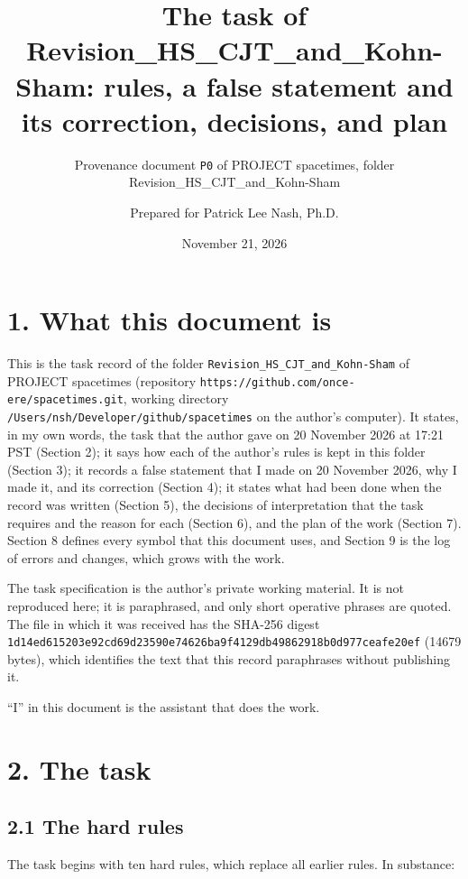 \documentclass[
  10pt,
]{article}
\title{The task of Revision\_HS\_CJT\_and\_Kohn-Sham: rules, a false
statement and its correction, decisions, and plan}
\subtitle{Provenance document \texttt{P0} of PROJECT spacetimes, folder
Revision\_HS\_CJT\_and\_Kohn-Sham}
\author{Prepared for Patrick Lee Nash, Ph.D.}
\date{November 21, 2026}
\begin{document}
\maketitle

\hypertarget{what-this-document-is}{%
\section{1. What this document is}\label{what-this-document-is}}

This is the task record of the folder
\texttt{Revision\_HS\_CJT\_and\_Kohn-Sham} of PROJECT spacetimes
(repository \texttt{https://github.com/once-ere/spacetimes.git}, working
directory \texttt{/Users/nsh/Developer/github/spacetimes} on the
author's computer). It states, in my own words, the task that the author
gave on 20 November 2026 at 17:21 PST (Section 2); it says how each of
the author's rules is kept in this folder (Section 3); it records a
false statement that I made on 20 November 2026, why I made it, and its
correction (Section 4); it states what had been done when the record was
written (Section 5), the decisions of interpretation that the task
requires and the reason for each (Section 6), and the plan of the work
(Section 7). Section 8 defines every symbol that this document uses, and
Section 9 is the log of errors and changes, which grows with the work.

The task specification is the author's private working material. It is
not reproduced here; it is paraphrased, and only short operative phrases
are quoted. The file in which it was received has the SHA-256 digest
\texttt{1d14ed615203e92cd69d23590e74626ba9f4129db49862918b0d977ceafe20ef}
(14679 bytes), which identifies the text that this record paraphrases
without publishing it.

``I'' in this document is the assistant that does the work.

\hypertarget{the-task}{%
\section{2. The task}\label{the-task}}

\hypertarget{the-hard-rules}{%
\subsection{2.1 The hard rules}\label{the-hard-rules}}

The task begins with ten hard rules, which replace all earlier rules. In
substance:
\end{document}
